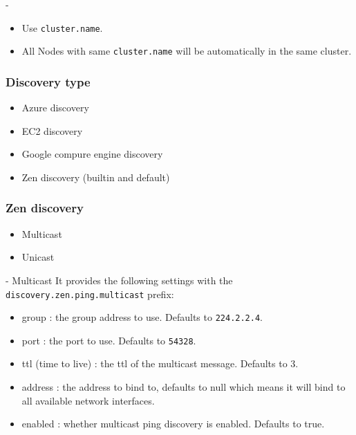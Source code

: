 \documentclass[]{beamer}
\begin{document}
\begin{frame}{\subsecname{} - \subsubsecname{}}
  \begin{itemize}
    \item Use \texttt{cluster.name}.
    \item All Nodes with same \texttt{cluster.name} will be automatically in the same cluster.
  \end{itemize}
\end{frame}

\subsubsection{Discovery type}

\begin{frame}{\subsubsecname{}}
  \begin{itemize}
    \item Azure discovery
    \item EC2 discovery
    \item Google compure engine discovery
    \item Zen discovery (builtin and default)
  \end{itemize}
\end{frame}

\subsubsection{Zen discovery}

\begin{frame}{\subsubsecname{}}
  \begin{itemize}
    \item Multicast
    \item Unicast
  \end{itemize}
\end{frame}

\begin{frame}{\subsubsecname{} - Multicast}
  It provides the following settings with the \texttt{discovery.zen.ping.multicast} prefix:
  \begin{itemize}
    \item group : the group address to use. Defaults to \texttt{224.2.2.4}.
    \item port : the port to use. Defaults to \texttt{54328}.
    \item ttl (time to live) : the ttl of the multicast message. Defaults to 3.
    \item address : the address to bind to, defaults to null which means it will bind to all available network interfaces.
    \item enabled : whether multicast ping discovery is enabled. Defaults to true.
  \end{itemize}
\end{frame}
\end{document}
